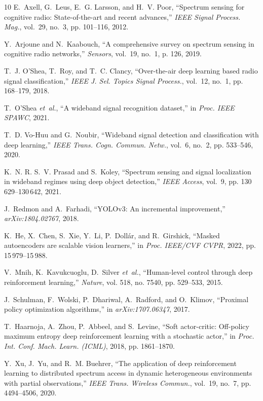 \documentclass[journal]{IEEEtran}
\begin{document}
{\begin{thebibliography}{10}
E.~Axell, G.~Leus, E.~G. Larsson, and H.~V. Poor, ``Spectrum sensing for
  cognitive radio: State-of-the-art and recent advances,'' \emph{IEEE Signal
  Process. Mag.}, vol.~29, no.~3, pp. 101--116, 2012.

Y.~Arjoune and N.~Kaabouch, ``A comprehensive survey on spectrum sensing in
  cognitive radio networks,'' \emph{Sensors}, vol.~19, no.~1, p. 126, 2019.

T.~J. O'Shea, T.~Roy, and T.~C. Clancy, ``Over-the-air deep learning based
  radio signal classification,'' \emph{IEEE J. Sel. Topics Signal Process.},
  vol.~12, no.~1, pp. 168--179, 2018.

T.~O'Shea \emph{et~al.}, ``A wideband signal recognition dataset,'' in
  \emph{Proc. IEEE SPAWC}, 2021.

T.~D. Vo-Huu and G.~Noubir, ``Wideband signal detection and classification with
  deep learning,'' \emph{IEEE Trans. Cogn. Commun. Netw.}, vol.~6, no.~2, pp.
  533--546, 2020.

K.~N. R. S.~V. Prasad and S.~Koley, ``Spectrum sensing and signal localization
  in wideband regimes using deep object detection,'' \emph{IEEE Access},
  vol.~9, pp. 130\,629--130\,642, 2021.

J.~Redmon and A.~Farhadi, ``{YOLOv3}: An incremental improvement,''
  \emph{arXiv:1804.02767}, 2018.

K.~He, X.~Chen, S.~Xie, Y.~Li, P.~Doll\'ar, and R.~Girshick, ``Masked
  autoencoders are scalable vision learners,'' in \emph{Proc. IEEE/CVF CVPR},
  2022, pp. 15\,979--15\,988.

V.~Mnih, K.~Kavukcuoglu, D.~Silver \emph{et~al.}, ``Human-level control through
  deep reinforcement learning,'' \emph{Nature}, vol. 518, no. 7540, pp.
  529--533, 2015.

J.~Schulman, F.~Wolski, P.~Dhariwal, A.~Radford, and O.~Klimov, ``Proximal
  policy optimization algorithms,'' in \emph{arXiv:1707.06347}, 2017.

T.~Haarnoja, A.~Zhou, P.~Abbeel, and S.~Levine, ``Soft actor-critic: Off-policy
  maximum entropy deep reinforcement learning with a stochastic actor,'' in
  \emph{Proc. Int. Conf. Mach. Learn. (ICML)}, 2018, pp. 1861--1870.

Y.~Xu, J.~Yu, and R.~M. Buehrer, ``The application of deep reinforcement
  learning to distributed spectrum access in dynamic heterogeneous environments
  with partial observations,'' \emph{IEEE Trans. Wireless Commun.}, vol.~19,
  no.~7, pp. 4494--4506, 2020.


\end{thebibliography}}
\end{document}
